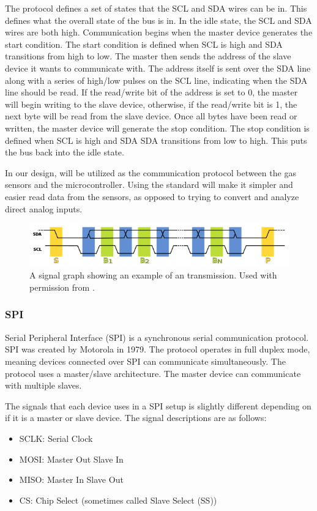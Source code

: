 The \iic protocol defines a set of states that the SCL and SDA wires can be in. This defines what the overall state of the \iic bus is in. In the idle state, the SCL and SDA wires are both high. Communication begins when the master device generates the start condition. The start condition is defined when SCL is high and SDA transitions from high to low. The master then sends the address of the slave device it wants to communicate with. The address itself is sent over the SDA line along with a series of high/low pulses on the SCL line, indicating when the SDA line should be read. If the read/write bit of the address is set to 0, the master will begin writing to the slave device, otherwise, if the read/write bit is 1, the next byte will be read from the slave device. Once all bytes have been read or written, the master device will generate the stop condition. The stop condition is defined when SCL is high and SDA SDA transitions from low to high. This puts the bus back into the idle state.

In our design, \iic will be utilized as the communication protocol between the gas sensors and the microcontroller. Using the \iic standard will make it simpler and easier read data from the sensors, as opposed to trying to convert and analyze direct analog inputs.

\begin{figure}
    \centering
    \includegraphics[width=6in]{figures/i2c-protocol.png}
    \caption{A signal graph showing an example of an \iic transmission. Used with permission from \cite{i2c-protocol}.}
    \label{fig:i2c-protocol}
\end{figure}

\subsubsection{SPI}
Serial Peripheral Interface (SPI) is a synchronous serial communication protocol. SPI was created by Motorola in 1979. The protocol operates in full duplex mode, meaning devices connected over SPI can communicate simultaneously. The protocol uses a master/slave architecture. The master device can communicate with multiple slaves.

The signals that each device uses in a SPI setup is slightly different depending on if it is a master or slave device. The signal descriptions are as follows:
\begin{itemize}
    \item SCLK: Serial Clock
    \item MOSI: Master Out Slave In
    \item MISO: Master In Slave Out
    \item CS: Chip Select (sometimes called Slave Select (SS))
\end{itemize}

